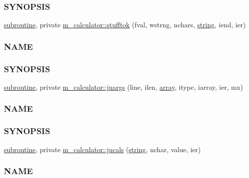 \begin{DoxyCompactItemize}
\begin{DoxyCompactList}
\subsubsection*{S\+Y\+N\+O\+P\+S\+IS}\end{DoxyCompactList}\item 
\hyperlink{M__stopwatch_83_8txt_acfbcff50169d691ff02d4a123ed70482}{subroutine}, private \hyperlink{namespacem__calculator_ae4cc2211f8bd276d5765e4ebc9d6e354}{m\+\_\+calculator\+::stufftok} (fval, wstrng, nchars, \hyperlink{what__overview_81_8txt_a74cb7e955273b9f9157b4f0c18a38849}{string}, iend, ier)
\begin{DoxyCompactList}\small\item\em \subsubsection*{N\+A\+ME}

\subsubsection*{S\+Y\+N\+O\+P\+S\+IS}\end{DoxyCompactList}\item 
\hyperlink{M__stopwatch_83_8txt_acfbcff50169d691ff02d4a123ed70482}{subroutine}, private \hyperlink{namespacem__calculator_a6fc04e994f45d649d5e412e0013bf127}{m\+\_\+calculator\+::juargs} (line, ilen, \hyperlink{intro__blas1_83_8txt_a89db1945e1a335ab0184c6a097821e32}{array}, itype, iarray, ier, mx)
\begin{DoxyCompactList}\small\item\em \subsubsection*{N\+A\+ME}

\subsubsection*{S\+Y\+N\+O\+P\+S\+IS}\end{DoxyCompactList}\item 
\hyperlink{M__stopwatch_83_8txt_acfbcff50169d691ff02d4a123ed70482}{subroutine}, private \hyperlink{namespacem__calculator_a1461bad85da11d09210daefe3f80973d}{m\+\_\+calculator\+::jucals} (\hyperlink{what__overview_81_8txt_a74cb7e955273b9f9157b4f0c18a38849}{string}, nchar, value, ier)
\begin{DoxyCompactList}\small\item\em \subsubsection*{N\+A\+ME}


\end{DoxyCompactList}
\end{DoxyCompactItemize}

